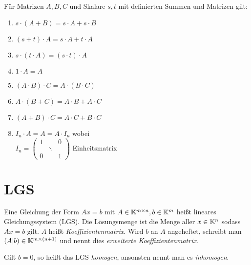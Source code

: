 \pagebreak

\begin{satz}
	Für Matrizen $A,B,C$ und Skalare $s,t$ mit definierten Summen und Matrizen gilt:
	\begin{multicols}{2}
		\begin{enumerate}[noitemsep]
			\item $s \cdot (A + B) = s \cdot A + s \cdot B$
			\item $(s+t) \cdot A = s \cdot A + t \cdot A$
			\item $s \cdot (t \cdot A) = (s \cdot t) \cdot A$
			\item $1 \cdot A = A$
			\item $(A \cdot B) \cdot C = A \cdot (B \cdot C)$
			\item $A \cdot (B + C) = A \cdot B + A \cdot C$
			\item $(A + B) \cdot C = A \cdot C + B \cdot C$
			\item $I_n \cdot A = A = A \cdot I_n$ wobei \\
			  $I_n = \begin{pmatrix}
			  1 &        & 0 \\
			    & \ddots &   \\
			  0 &        & 1
			\end{pmatrix}$ Einheitsmatrix
		\end{enumerate}
	\end{multicols}
\end{satz}


\section{LGS}

\begin{definition}
	Eine Gleichung der Form $Ax=b$ mit $A \in \mathbb{K}^{m \times n}, b \in \mathbb{K}^m$ heißt lineares Gleichungssystem (LGS). Die Lösungsmenge ist die Menge aller $x \in \mathbb{K}^n$ sodass $Ax = b$ gilt. $A$ heißt \emph{Koeffizientenmatrix}. Wird $b$ an $A$ angeheftet, schreibt man $(A|b) \in \mathbb{K}^{m \times (n+1)}$ und nennt dies \emph{erweiterte Koeffizientenmatrix}.
\end{definition}

\begin{definition}
	Gilt $b = 0$, so heißt das LGS \emph{homogen}, ansonsten nennt man es \emph{inhomogen}.
\end{definition}

